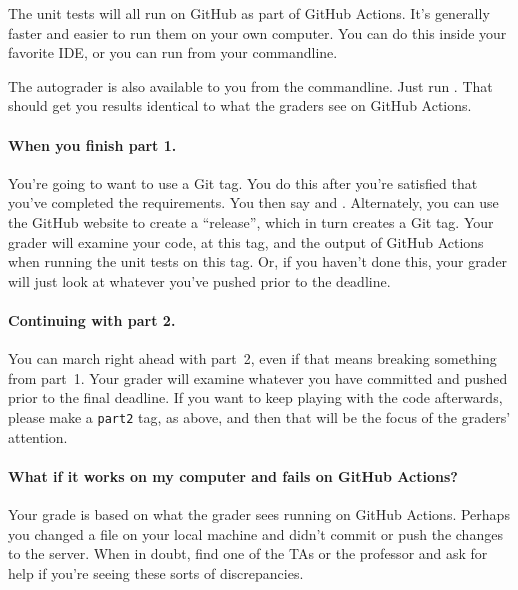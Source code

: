 The unit tests will all run on GitHub as part of GitHub Actions. It's
generally faster and easier to run them on your own computer. You can
do this inside your favorite IDE, or you can run  from
your commandline.

The autograder is also available to you from the commandline.
Just run .
That should get you results identical to what the graders see
on GitHub Actions.

\paragraph{When you finish part 1.} You're going to want to use a Git
tag. You do this after you're satisfied that you've completed the
requirements. You then say  and . Alternately, you can use the GitHub website to create a
``release'', which in turn creates a Git tag. Your grader will
examine your code, at this tag, and the output of GitHub Actions
when running the unit tests on this tag. Or, if you haven't done
this, your grader will just look at whatever you've pushed prior
to the deadline.

\paragraph{Continuing with part 2.} You can march right ahead with
part~2, even if that means breaking something from part~1. Your
grader will examine whatever you have committed and pushed prior to the
final deadline. If you want to keep playing with the code afterwards,
please make a {\tt part2} tag, as above, and then that will
be the focus of the graders' attention.

\paragraph{What if it works on my computer and fails on GitHub
  Actions?} Your grade is based on what the grader sees running on
GitHub Actions. Perhaps you changed a file on your local machine and
didn't commit or push the changes to the server. When in doubt,
find one of the TAs or the professor and ask for help if you're
seeing these sorts of discrepancies.

